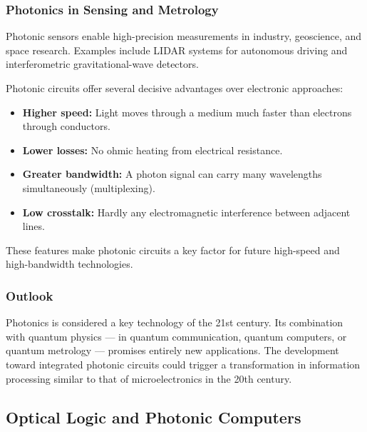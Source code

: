 \subsubsection{Photonics in Sensing and Metrology}

Photonic sensors enable high-precision measurements in industry, geoscience, and space research.  
Examples include LIDAR systems for autonomous driving and interferometric gravitational-wave detectors.
\newpage
\noindent
\vspace{1em}
\begin{tcolorbox}[physikbox, title=Photonic Circuits vs. Electronic Circuits \label{box:photon_vs_electron}]
	\small
	Photonic circuits offer several decisive advantages over electronic approaches:
	\begin{itemize}
		\item \textbf{Higher speed:} Light moves through a medium much faster than electrons through conductors.
		\item \textbf{Lower losses:} No ohmic heating from electrical resistance.
		\item \textbf{Greater bandwidth:} A photon signal can carry many wavelengths simultaneously (multiplexing).
		\item \textbf{Low crosstalk:} Hardly any electromagnetic interference between adjacent lines.
	\end{itemize}
	These features make photonic circuits a key factor for future high-speed and high-bandwidth technologies.
\end{tcolorbox}

\subsubsection{Outlook}

Photonics is considered a key technology of the 21st century. Its combination with quantum physics — in quantum communication, quantum computers, or quantum metrology — promises entirely new applications.  
The development toward integrated photonic circuits could trigger a transformation in information processing similar to that of microelectronics in the 20th century.

\subsection{Optical Logic and Photonic Computers}

